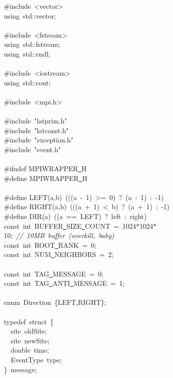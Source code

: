 {\ttfamily \raggedright \small
\#include\ <{}vector>{}\\
using\ std::vector;\\
\ \\
\#include\ <{}fstream>{}\\
using\ std::fstream;\\
using\ std::endl;\\
\ \\
\#include\ <{}iostream>{}\\
using\ std::cout;\\
\ \\
\#include\ <{}mpi.h>{}\\
\ \\
\#include\ "{}latprim.h"{}\\
\#include\ "{}latconst.h"{}\\
\#include\ "{}exception.h"{}\\
\#include\ "{}event.h"{}\\
\ \\
\#ifndef MPIWRAPPER\underline\ H\\
\#define MPIWRAPPER\underline\ H\\
\ \\
\#define LEFT(a,b)\ (((a\ -{}\ 1)\ >{}=\ 0)\ ?\ (a\ -{}\ 1)\ :\ -{}1)\\
\#define RIGHT(a,b)\ (((a\ +\ 1)\ <{}\ b)\ ?\ (a\ +\ 1)\ :\ -{}1)\\
\#define DIR(a)\ ((a\ ==\ LEFT)\ ?\ left\ :\ right)\\
const\ int\ BUFFER\underline\ SIZE\underline\ COUNT\ =\ 1024$\ast$1024$\ast$10;\ \textsl{//\ 10MB\ buffer\ (overkill,\ baby)}\\
const\ int\ ROOT\underline\ RANK\ =\ 0;\\
const\ int\ NUM\underline\ NEIGHBORS\ =\ 2;\\
\ \\
const\ int\ TAG\underline\ MESSAGE\ =\ 0;\\
const\ int\ TAG\underline\ ANTI\underline\ MESSAGE\ =\ 1;\\
\ \\
enum\ Direction\ \{LEFT,RIGHT\};\\
\ \\
typedef\ struct\ \{\\
\ \ site\ oldSite;\\
\ \ site\ newSite;\\
\ \ double\ time;\\
\ \ EventType\ type;\\
\}\ message;\\
}
